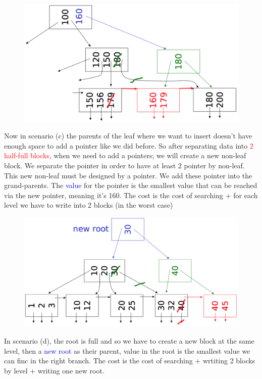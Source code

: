 \documentclass[12pt,a4paper]{article}
\begin{document}
\begin{figure}
\vspace{-5mm}
\includegraphics[scale=0.25]{img/img38.png}
\end{figure}
Now in scenario (c) the parents of the leaf where we want to insert doesn't have enough space to add a pointer like we did before. So after separating data into \textcolor{red}{2 half-full blocks}, when we need to add a pointers; we will create a \textcolor{ao}{new non-leaf block}. We separate the pointer in order to have at least 2 pointer by non-leaf. This new non-leaf must be designed by a pointer. We add these pointer into the grand-parents. The \textcolor{blue}{value} for the pointer is the smallest value that can be reached via the new pointer, meaning it's 160. The cost is the cost of searching + for each level we have to write into 2 blocks (in the worst case)\\


\begin{figure}
\vspace{-5mm}
\includegraphics[scale=0.29]{img/img39.png}
\end{figure}
In scenario (d), the root is full and so we have to create a \textcolor{ao}{new block} at the same level, then a \textcolor{blue}{new root} as their parent, value in the root is the smallest value we can finc in the right branch. The cost is the cost of searching + wrtiting 2 blocks by level + writing one new root.\\
\\
\\
\end{document}

